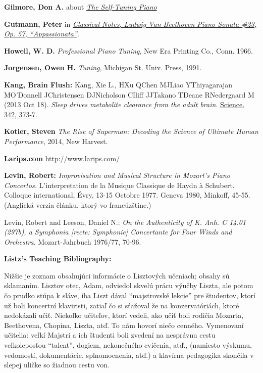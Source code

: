 \documentclass[11pt,a4paper]{book}
\begin{document}
\textbf{\hypertarget{r:gilmore}{Gilmore, Don A.}} about
\href{http://www.gizmag.com/gilmore-self-tuning-piano-system/21425/}{\emph{The
Self-Tuning Piano}}

{\textbf{Gutmann, Peter}} in
\href{http://www.classicalnotes.net/classics3/appassionata.html}{\emph{Classical
Notes, Ludwig Van Beethoven Piano Sonata \#23, Op. 57,
``Appassionata''}}.{~}

{\textbf{Howell, W. D.}} \emph{Professional Piano
Tuning}, New Era Printing Co., Conn. 1966.

\textbf{Jorgensen, Owen H.}{ \emph{Tuning},
Michigan St. Univ. Press, 1991.}

\textbf{\hypertarget{r:kang}{Kang, Brain Flush:}} Kang, Xie L., HXu
QChen MJLiao YThiyagarajan MO'Donnell JChristensen DJNicholson CIliff
JJTakano TDeane RNedergaard M (2013 Oct 18). \emph{Sleep drives
metabolite clearance from the adult brain}.
\href{http://www.sciencemag.org/content/342/6156/373}{Science. 342,
373-7}.

{\textbf{Kotier, Steven}} \emph{The Rise of
Superman: Decoding the Science of Ultimate Human Performance}, 2014, New
Harvest.

\textbf{Larips.com} http://www.larips.com/

{\textbf{Levin, Robert:}} \emph{Improvisation and Musical Structure in Mozart's Piano Concertos.} L'interpretation de la Musique Classique de Haydn à Schubert. Colloque international, Évry, 13-15 Octobre 1977. Geneva 1980, Minkoff, 45-55. (Anglická verzia článku, ktorý vo francúzštine.)


Levin, Robert and Leeson, Daniel N.: \emph{On the Authenticity of K.
Anh. C 14.01 (297b), a Symphonia {[}recte: Symphonie{]} Concertante for
Four Winds and Orchestra}. Mozart-Jahrbuch 1976/77, 70-96.

\textbf{Listz's Teaching Bibliography:}{{~}}

Nižšie je zoznam obsahujúci informácie o Lisztových učeniach; obsahy sú sklamaním. Lisztov otec, Adam, odviedol skvelú prácu výučby Liszta, ale potom čo prudko stúpa k sláve, iba Liszt dával “majstrovské lekcie” pre študentov, ktorí už boli koncertní klaviristi, zatiaľ čo si sťažoval že na konzervatóriách, ktoré nedokázali učiť. Niekoľko učiteľov, ktorí vedeli, ako učiť boli rodičia Mozarta, Beethovena, Chopina, Liszta, atď. To nám hovorí niečo cenného. Vymenovaní učitelia: veľkí Majstri a ich študenti boli zvedení na nesprávnu cestu  veľkoleposťou “talent”, dogiem, nekonečného cvičenia, atď., (namiesto výskumu, vedomostí, dokumentácie, splnomocnenia, atď.) a klavírna pedagogika skončila v slepej uličke so žiadnou cestu von.
\end{document}
